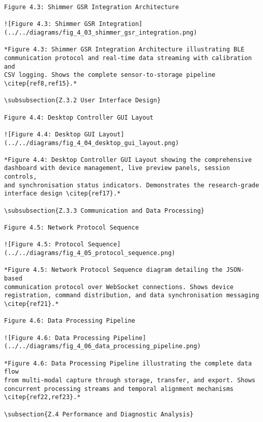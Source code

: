 \begin{verbatim}
Figure 4.3: Shimmer GSR Integration Architecture

![Figure 4.3: Shimmer GSR Integration](../../diagrams/fig_4_03_shimmer_gsr_integration.png)

*Figure 4.3: Shimmer GSR Integration Architecture illustrating BLE
communication protocol and real-time data streaming with calibration and
CSV logging. Shows the complete sensor-to-storage pipeline \citep{ref8,ref15}.*

\subsubsection{Z.3.2 User Interface Design}

Figure 4.4: Desktop Controller GUI Layout

![Figure 4.4: Desktop GUI Layout](../../diagrams/fig_4_04_desktop_gui_layout.png)

*Figure 4.4: Desktop Controller GUI Layout showing the comprehensive
dashboard with device management, live preview panels, session controls,
and synchronisation status indicators. Demonstrates the research-grade
interface design \citep{ref17}.*

\subsubsection{Z.3.3 Communication and Data Processing}

Figure 4.5: Network Protocol Sequence

![Figure 4.5: Protocol Sequence](../../diagrams/fig_4_05_protocol_sequence.png)

*Figure 4.5: Network Protocol Sequence diagram detailing the JSON-based
communication protocol over WebSocket connections. Shows device
registration, command distribution, and data synchronisation messaging
\citep{ref21}.*

Figure 4.6: Data Processing Pipeline

![Figure 4.6: Data Processing Pipeline](../../diagrams/fig_4_06_data_processing_pipeline.png)

*Figure 4.6: Data Processing Pipeline illustrating the complete data flow
from multi-modal capture through storage, transfer, and export. Shows
concurrent processing streams and temporal alignment mechanisms \citep{ref22,ref23}.*

\subsection{Z.4 Performance and Diagnostic Analysis}


\end{verbatim}
